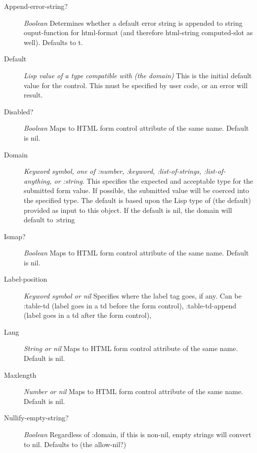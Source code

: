 \documentclass [11pt]{book}
\begin{document}
\begin{itemize}
\begin{description}
\item [Append-error-string?]
\emph{Boolean} Determines whether a default error string is appended to string ouput-function for
html-format (and therefore html-string computed-slot as well). Defaults to t.


\item [Default]
\emph{Lisp value of a type compatible with (the domain)} This is the initial default value for the control.
This must be specified by user code, or an error will result.


\item [Disabled?]
\emph{Boolean} Maps to HTML form control attribute of the same name. Default is nil.


\item [Domain]
\emph{Keyword symbol, one of :number, :keyword, :list-of-strings, :list-of-anything, or :string}.
This specifies the expected and acceptable type for the submitted form value. If possible, the
submitted value will be coerced into the specified type. The default is based upon
the Lisp type of (the default) provided as input to this object. If the default is nil,
the domain will default to :string


\item [Ismap?]
\emph{Boolean} Maps to HTML form control attribute of the same name. Default is nil.


\item [Label-position]
\emph{Keyword symbol or nil} Specifies where the label tag goes, if any.
Can be :table-td (label goes in a td before the form control), :table-td-append (label goes in a td after the form control),


\item [Lang]
\emph{String or nil} Maps to HTML form control attribute of the same name. Default is nil.


\item [Maxlength]
\emph{Number or nil} Maps to HTML form control attribute of the same name. Default is nil.


\item [Nullify-empty-string?]
\emph{Boolean} Regardless of :domain, if this is non-nil, empty strings will convert to nil. Defaults to (the allow-nil?)



\end{description}
\end{itemize}
\end{document}
